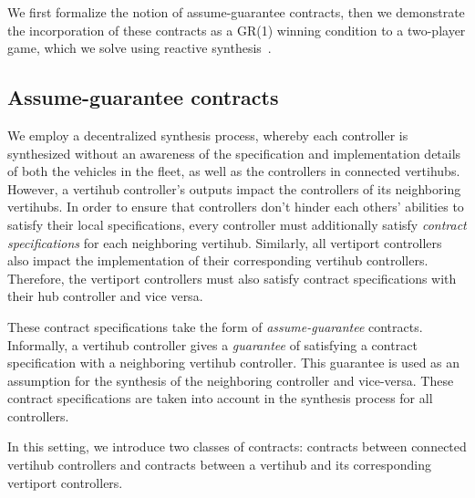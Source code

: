 We first formalize the notion of assume-guarantee contracts, then we demonstrate the incorporation of these contracts as a GR(1) winning condition to a two-player game, which we solve using reactive synthesis~\cite{Piterman06,bloem2012synthesis}. 

\subsection{Assume-guarantee contracts}

We employ a decentralized synthesis process, whereby each controller is synthesized without an awareness of the specification and implementation details of both the vehicles in the fleet, as well as the controllers in connected vertihubs.
However, a vertihub controller's outputs impact the controllers of its neighboring vertihubs. 
In order to ensure that controllers don't hinder each others' abilities to satisfy their local specifications, every controller must additionally satisfy \emph{contract specifications} for each neighboring vertihub.
Similarly, all vertiport controllers also impact the implementation of their corresponding vertihub controllers. Therefore, the vertiport controllers must also satisfy contract specifications with their hub controller and vice versa. 

 These contract specifications take the form of \emph{assume-guarantee} contracts. 
 Informally, a vertihub controller gives a \emph{guarantee} of satisfying a contract specification with a neighboring vertihub controller.
 This guarantee is used as an assumption for the synthesis of the neighboring controller and vice-versa.
 These contract specifications are taken into account in the synthesis process for all controllers. 


 
 In this setting, we introduce two classes of contracts: contracts between connected vertihub controllers and contracts between a vertihub and its corresponding vertiport controllers. 
 
